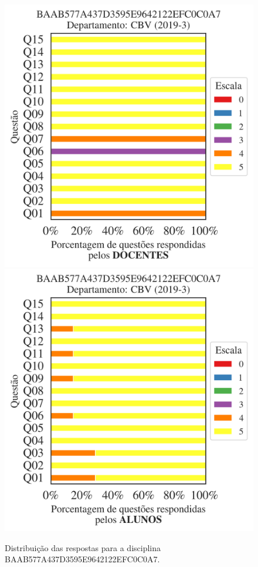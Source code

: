 \documentclass[a4paper,10pt]{article}
\begin{document}
\begin{figure}[h]
\centering
\includegraphics[width=0.485\linewidth]{analise_disciplina_departamento_CBV_BAAB577A437D3595E9642122EFC0C0A7_docentes.png}
\includegraphics[width=0.485\linewidth]{analise_disciplina_departamento_CBV_BAAB577A437D3595E9642122EFC0C0A7_alunos.png}
\caption{\label{fig:analise_geral_departamento}                Distribuição das respostas para a disciplina BAAB577A437D3595E9642122EFC0C0A7. }
\end{figure}
\end{document}
